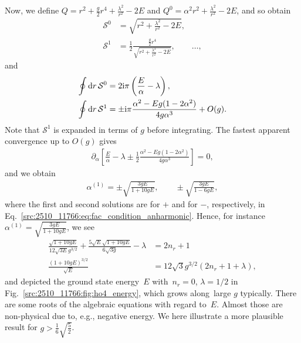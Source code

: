 Now, we define $Q=r^2 + \frac{g}{2}r^4 + \frac{\lambda^2}{r^2} - 2E$ and $Q^0 = \alpha^2 r^2 + \frac{\lambda^2}{r^2} - 2 E$, and so obtain
\begin{align}
    \mathcal{S}^0 &= \sqrt{r^2 + \frac{\lambda^2}{r^2} - 2 E} , \\
    \mathcal{S}^1 &= \frac{1}{2} \frac{\frac{g}{2} r^4}{\sqrt{r^2 + \frac{\lambda^2}{r^2} - 2 E}}, \qquad \dots,
\end{align}
and
\begin{align}
    \oint \mathrm{d} r\, \mathcal{S}^0 &= 2\mathrm{i} \pi \left(\frac{E}{\alpha} - \lambda\right) ,\\
    \oint \mathrm{d} r\, \mathcal{S}^1
    &= \pm \mathrm{i} \pi \frac{\alpha^2 - E g (1 - 2 \alpha^2)}{4 g \alpha^{3}} + O(g) .
\end{align}
Note that $\mathcal{S}^1$ is expanded in terms of $g$ before integrating. The fastest apparent convergence up to $O(g)$ gives 
\begin{align}
    \partial_\alpha\left[\frac{E}{\alpha} - \lambda \pm \frac{1}{2}\frac{\alpha^2 - E g (1 - 2 \alpha^2)}{4 g \alpha^{3}}\right] = 0 ,
    \label{src:2510_11766:eq:fac_condition_anharmonic}
\end{align}
and we obtain
\begin{align}
    \alpha^{(1)} = \pm\sqrt{\frac{3gE}{1 + 10gE}}, \qquad
    \pm\sqrt{\frac{3gE}{1 - 6gE}} ,
\end{align}
where the first and second solutions are for $+$ and for $-$, respectively, in Eq.~\eqref{src:2510_11766:eq:fac_condition_anharmonic}.
Hence, for instance $\alpha^{(1)} = \sqrt{\frac{3gE}{1 + 10gE}}$, we see
\begin{align}
    \frac{\sqrt{1 + 10gE}}{12 \sqrt{3E} g^{3/2}} + \frac{5 \sqrt{E} \sqrt{1 + 10gE}}{6 \sqrt{3g}} - \lambda &= 2n_r + 1
    \\
    \frac{(1+10 g E)^{3/2}}{\sqrt{E}} &= 12\sqrt{3}g^{3/2}(2n_r + 1 + \lambda) ,
    \label{src:2510_11766:eq:ho4_energy}
\end{align}
and depicted the ground state energy~$E$ with~$n_r=0$, $\lambda=1/2$ in Fig.~\ref{src:2510_11766:fig:ho4_energy}, which grows along~large $g$ typically.
There are some roots of the algebraic equations with regard to~$E$. Almost those are non-physical due to, e.g., negative energy. We here illustrate a more plausible result for $g>\frac{1}{6}\sqrt{\frac{5}{2}}$.
